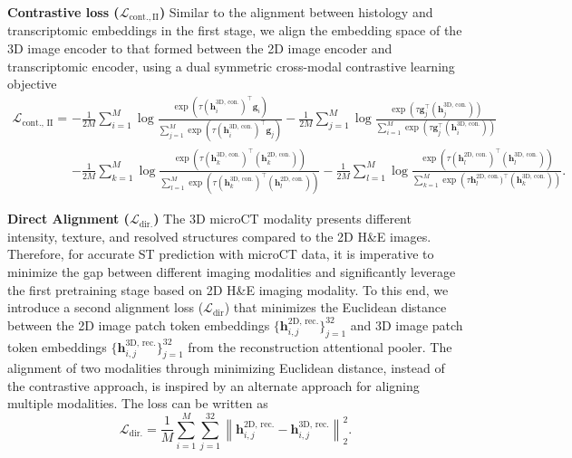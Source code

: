 \textbf{Contrastive loss ($\mathcal{L}_{\text{cont.}, \mathrm{II}}$)} Similar to the alignment between histology and transcriptomic embeddings in the first stage, we align the embedding space of the 3D image encoder to that formed between the 2D image encoder and transcriptomic encoder, using a dual symmetric cross-modal contrastive learning objective
\begin{equation}
\begin{aligned}
\mathcal{L}_{\text{cont., II}} = 
& - \frac{1}{2M} \sum_{i=1}^{M} \log \frac{\exp\left(\tau (\mathbf{h}_{i}^{\text{3D, con.}})^{\top} \mathbf{g}_i \right)}{\sum_{j=1}^{M} \exp\left(\tau (\mathbf{h}_{i}^{\text{3D, con.}})^{\top} \mathbf{g}_j \right)} 
- \frac{1}{2M} \sum_{j=1}^{M} \log \frac{\exp\left(\tau \mathbf{g}_j^{\top} (\mathbf{h}_{j}^{\text{3D, con.}}) \right)}{\sum_{i=1}^{M} \exp\left(\tau \mathbf{g}_j^{\top} (\mathbf{h}_{i}^{\text{3D, con.}}) \right)} \\
& - \frac{1}{2M} \sum_{k=1}^{M} \log \frac{\exp\left(\tau (\mathbf{h}_{k}^{\text{3D, con.}})^{\top} (\mathbf{h}_{k}^{\text{2D, con.}}) \right)}{\sum_{l=1}^{M} \exp\left(\tau (\mathbf{h}_{k}^{\text{3D, con.}})^{\top} (\mathbf{h}_{l}^{\text{2D, con.}}) \right)} 
- \frac{1}{2M} \sum_{l=1}^{M} \log \frac{\exp\left(\tau (\mathbf{h}_{l}^{\text{2D, con.}})^{\top} (\mathbf{h}_{l}^{\text{3D, con.}}) \right)}{\sum_{k=1}^{M} \exp\left(\tau \mathbf{h}_{l}^{\text{2D, con.}})^{\top} (\mathbf{h}_{k}^{\text{3D, con.}}) \right)}.
\end{aligned}
\end{equation}

\textbf{Direct Alignment ($\mathcal{L}_{\text{dir.}}$)} The 3D microCT modality presents different intensity, texture, and resolved structures compared to the 2D H\&E images. Therefore, for accurate ST prediction with microCT data, it is imperative to minimize the gap between different imaging modalities and significantly leverage the first pretraining stage based on 2D H\&E imaging modality. To this end, we introduce a second alignment loss ($\mathcal{L}_{\text{dir}}$) that minimizes the Euclidean distance between the 2D image patch token embeddings $\{\mathbf{h}_{i,j}^{\text{2D, rec.}}\}_{j=1}^{32}$ and 3D image patch token embeddings $\{\mathbf{h}_{i,j}^{\text{3D, rec.}}\}_{j=1}^{32}$ from the reconstruction attentional pooler. The alignment of two modalities through minimizing Euclidean distance, instead of the contrastive approach, is inspired by an alternate approach for aligning multiple modalities\cite{yang2021multi}. The loss can be written as
\begin{equation}
\mathcal{L}_{\text{dir.}} = \frac{1}{M} \sum_{i=1}^{M} \sum_{j=1}^{32} \left\| \mathbf{h}_{i,j}^{\text{2D, rec.}} - \mathbf{h}_{i,j}^{\text{3D, rec.}} \right\|_2^2.
\end{equation}

